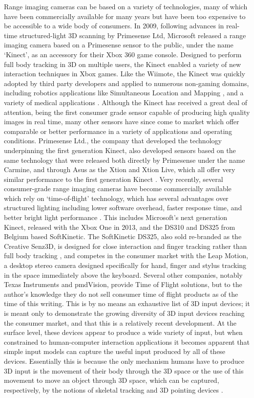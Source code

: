 Range imaging cameras can be based on a variety of technologies, many of which have been commercially available for many years but have been too expensive to be accessible to a wide body of consumers. In 2009, following advances in real-time structured-light 3D scanning by Primesense Ltd, Microsoft released a range imaging camera based on a Primesense sensor to the public, under the name ‘Kinect', as an accessory for their Xbox 360 game console. Designed to perform full body tracking in 3D on multiple users, the Kinect enabled a variety of new interaction techniques in Xbox games. Like the Wiimote, the Kinect was quickly adopted by third party developers and applied to numerous non-gaming domains, including robotics applications like Simultaneous Location and Mapping \cite{iser-rgbd-slam}, and a variety of medical applications \cite{kinect-medical}. Although the Kinect has received a great deal of attention, being the first consumer grade sensor capable of producing high quality images in real time, many other sensors have since come to market which offer comparable or better performance in a variety of applications and operating conditions. Primesense Ltd., the company that developed the technology underpinning the first generation Kinect, also developed sensors based on the same technology that were released both directly by Primesense under the name Carmine, and through Asus as the Xtion  and Xtion Live, which all offer very similar performance to the first generation Kinect \cite{depth-sensor-comparison}. Very recently, several consumer-grade range imaging cameras have become commercially available which rely on ‘time-of-flight' technology, which has several advantages over structured lighting including lower software overhead, faster response time, and better bright light performance \cite{ti-tof}. This includes Microsoft's next generation Kinect, released with the Xbox One in 2013, and the DS310 and DS325 from Belgium based SoftKinetic. The SoftKinetic DS325, also sold re-branded as the Creative Senz3D, is designed for close interaction and finger tracking rather than full body tracking \cite{softkinetc-products}, and competes in the consumer market with the Leap Motion, a desktop stereo camera designed specifically for hand, finger and stylus tracking in the space immediately above the keyboard. Several other companies, notably Texas Instruments and pmdVision, provide Time of Flight solutions, but to the author's knowledge they do not sell consumer time of flight products as of the time of this writing. 
This is by no means an exhaustive list of 3D input devices; it is meant only to demonstrate the growing diversity of 3D input devices reaching the consumer market, and that this is a relatively recent development. At the surface level, these devices appear to produce a wide variety of input, but when constrained to human-computer interaction applications it becomes apparent that simple input models can capture the useful input produced by all of these devices. Essentially this is because the only mechanism humans have to produce 3D input is the movement of their body through the 3D space or the use of this movement to move an object through 3D space, which can be captured, respectively, by the notions of skeletal tracking and 3D pointing devices \cite{jester}.

